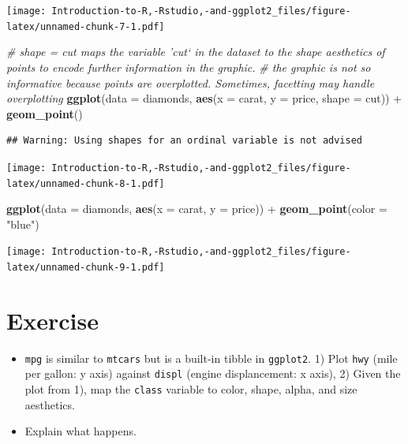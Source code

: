 \documentclass[]{book}
\newenvironment{Shaded}{\begin{snugshade}}{\end{snugshade}}
\newcommand{\KeywordTok}[1]{\textcolor[rgb]{0.13,0.29,0.53}{\textbf{{#1}}}}
\newcommand{\DataTypeTok}[1]{\textcolor[rgb]{0.13,0.29,0.53}{{#1}}}
\newcommand{\StringTok}[1]{\textcolor[rgb]{0.31,0.60,0.02}{{#1}}}
\newcommand{\CommentTok}[1]{\textcolor[rgb]{0.56,0.35,0.01}{\textit{{#1}}}}
\newcommand{\NormalTok}[1]{{#1}}
\begin{document}
\texttt{[image: Introduction-to-R,-Rstudio,-and-ggplot2\_files/figure-latex/unnamed-chunk-7-1.pdf]}

\begin{Shaded}
\begin{Highlighting}[]
\CommentTok{# shape = cut maps the variable 'cut` in the dataset to the shape aesthetics of points to encode further information in the graphic. }
\CommentTok{# the graphic is not so informative because points are overplotted. Sometimes, facetting may handle overplotting }
\KeywordTok{ggplot}\NormalTok{(}\DataTypeTok{data =} \NormalTok{diamonds, }\KeywordTok{aes}\NormalTok{(}\DataTypeTok{x =} \NormalTok{carat, }\DataTypeTok{y =} \NormalTok{price, }\DataTypeTok{shape =} \NormalTok{cut)) +}\StringTok{ }\KeywordTok{geom_point}\NormalTok{()}
\end{Highlighting}
\end{Shaded}

\begin{verbatim}
## Warning: Using shapes for an ordinal variable is not advised
\end{verbatim}

\texttt{[image: Introduction-to-R,-Rstudio,-and-ggplot2\_files/figure-latex/unnamed-chunk-8-1.pdf]}

\begin{Shaded}
\begin{Highlighting}[]
\KeywordTok{ggplot}\NormalTok{(}\DataTypeTok{data =} \NormalTok{diamonds, }\KeywordTok{aes}\NormalTok{(}\DataTypeTok{x =} \NormalTok{carat, }\DataTypeTok{y =} \NormalTok{price)) +}\StringTok{ }\KeywordTok{geom_point}\NormalTok{(}\DataTypeTok{color =} \StringTok{"blue"}\NormalTok{)}
\end{Highlighting}
\end{Shaded}

\texttt{[image: Introduction-to-R,-Rstudio,-and-ggplot2\_files/figure-latex/unnamed-chunk-9-1.pdf]}

\section{Exercise}\label{exercise-1}

\begin{itemize}
\item
  \texttt{mpg} is similar to \texttt{mtcars} but is a built-in tibble in
  \texttt{ggplot2}. 1) Plot \texttt{hwy} (mile per gallon: y axis)
  against \texttt{displ} (engine displancement: x axis), 2) Given the
  plot from 1), map the \texttt{class} variable to color, shape, alpha,
  and size aesthetics.
\item
  Explain what happens.
\end{itemize}
\end{document}
